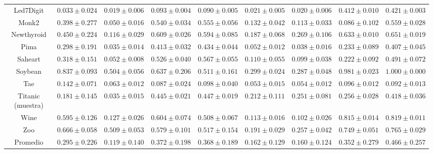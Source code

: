 \begin{landscape}
\begin{table}
{\begin{tabular}{|c|cccccccc|}
	Led7Digit & $0.033 \pm 0.024$ & $0.019 \pm 0.006$ & $0.093 \pm 0.004$ & $0.090 \pm 0.005$ & $0.021 \pm 0.005$ & $0.020 \pm 0.006$ & $0.412 \pm 0.010$ & $0.421 \pm 0.003$\\ 
	Monk2 & $0.398 \pm 0.277$ & $0.050 \pm 0.016$ & $0.540 \pm 0.034$ & $0.555 \pm 0.056$ & $0.132 \pm 0.042$ & $0.113 \pm 0.033$ & $0.086 \pm 0.102$ & $0.559 \pm 0.028$\\ 
	Newthyroid & $0.450 \pm 0.224$ & $0.116 \pm 0.029$ & $0.609 \pm 0.026$ & $0.594 \pm 0.085$ & $0.187 \pm 0.068$ & $0.269 \pm 0.106$ & $0.633 \pm 0.010$ & $0.651 \pm 0.019$\\ 
	Pima & $0.298 \pm 0.191$ & $0.035 \pm 0.014$ & $0.413 \pm 0.032$ & $0.434 \pm 0.044$ & $0.052 \pm 0.012$ & $0.038 \pm 0.016$ & $0.233 \pm 0.089$ & $0.407 \pm 0.045$\\ 
	Saheart & $0.318 \pm 0.151$ & $0.052 \pm 0.008$ & $0.526 \pm 0.040$ & $0.567 \pm 0.055$ & $0.110 \pm 0.055$ & $0.099 \pm 0.038$ & $0.222 \pm 0.092$ & $0.491 \pm 0.072$\\ 
	Soybean & $0.837 \pm 0.093$ & $0.504 \pm 0.056$ & $0.637 \pm 0.206$ & $0.511 \pm 0.161$ & $0.299 \pm 0.024$ & $0.287 \pm 0.048$ & $0.981 \pm 0.023$ & $1.000 \pm 0.000$\\ 
	Tae & $0.142 \pm 0.071$ & $0.063 \pm 0.012$ & $0.087 \pm 0.024$ & $0.098 \pm 0.040$ & $0.053 \pm 0.015$ & $0.054 \pm 0.012$ & $0.096 \pm 0.012$ & $0.092 \pm 0.013$\\ 
	Titanic (muestra) & $0.181 \pm 0.145$ & $0.035 \pm 0.015$ & $0.445 \pm 0.021$ & $0.447 \pm 0.019$ & $0.212 \pm 0.111$ & $0.251 \pm 0.081$ & $0.256 \pm 0.028$ & $0.418 \pm 0.036$\\ 
	Wine & $0.595 \pm 0.126$ & $0.127 \pm 0.026$ & $0.604 \pm 0.074$ & $0.508 \pm 0.067$ & $0.113 \pm 0.016$ & $0.102 \pm 0.026$ & $0.815 \pm 0.014$ & $0.819 \pm 0.011$\\ 
	Zoo & $0.666 \pm 0.058$ & $0.509 \pm 0.053$ & $0.579 \pm 0.101$ & $0.517 \pm 0.154$ & $0.191 \pm 0.029$ & $0.257 \pm 0.042$ & $0.749 \pm 0.051$ & $0.765 \pm 0.029$\\ 
	\hline
	Promedio & $0.295 \pm 0.226$ & $0.119 \pm 0.140$ & $0.372 \pm 0.198$ & $0.368 \pm 0.189$ & $0.162 \pm 0.129$ & $0.160 \pm 0.124$ & $0.352 \pm 0.279$ & $0.466 \pm 0.257$\\
	\hline
	\end{tabular}
}
\end{table}




\end{landscape}
